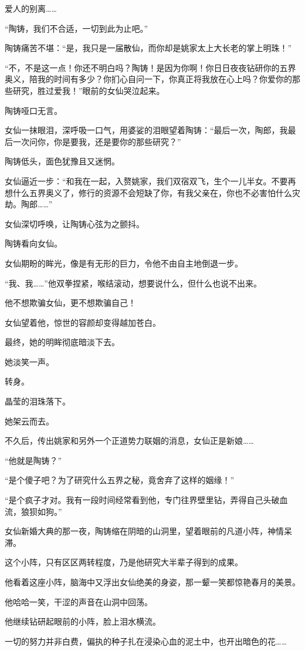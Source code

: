 \begin{this_body}
爱人的别离……

“陶铸，我们不合适，一切到此为止吧。”

陶铸痛苦不堪：“是，我只是一届散仙，而你却是姚家太上大长老的掌上明珠！”

“不，不是这一点！你还不明白吗？陶铸！是因为你啊！你日日夜夜钻研你的五界奥义，陪我的时间有多少？你扪心自问一下，你真正将我放在心上吗？你爱你的那些研究，胜过爱我！”眼前的女仙哭泣起来。

陶铸哑口无言。

女仙一抹眼泪，深呼吸一口气，用婆娑的泪眼望着陶铸：“最后一次，陶郎，我最后一次问你，你是要我，还是要你的那些研究？”

陶铸低头，面色犹豫且又迷惘。

女仙逼近一步：“和我在一起，入赘姚家，我们双宿双飞，生个一儿半女。不要再想什么五界奥义了，修行的资源不会短缺了你，有我父亲在，你也不必害怕什么灾劫。陶郎……”

女仙深切呼唤，让陶铸心弦为之颤抖。

陶铸看向女仙。

女仙期盼的眸光，像是有无形的巨力，令他不由自主地倒退一步。

“我、我……”他双拳捏紧，喉结滚动，想要说什么，但什么也说不出来。

他不想欺骗女仙，更不想欺骗自己！

女仙望着他，惊世的容颜却变得越加苍白。

最终，她的明眸彻底暗淡下去。

她淡笑一声。

转身。

晶莹的泪珠落下。

她架云而去。

不久后，传出姚家和另外一个正道势力联姻的消息，女仙正是新娘……

“他就是陶铸？”

“是个傻子吧？为了研究什么五界之秘，竟舍弃了这样的姻缘！”

“是个疯子才对。我有一段时间经常看到他，专门往界壁里钻，弄得自己头破血流，狼狈如狗。”

女仙新婚大典的那一夜，陶铸缩在阴暗的山洞里，望着眼前的凡道小阵，神情呆滞。

这个小阵，只有区区两转程度，乃是他研究大半辈子得到的成果。

他看着这座小阵，脑海中又浮出女仙绝美的身姿，那一颦一笑都惊艳春月的美景。

他哈哈一笑，干涩的声音在山洞中回荡。

他继续钻研起眼前的小阵，脸上泪水横流。

一切的努力并非白费，偏执的种子扎在浸染心血的泥土中，也开出暗色的花……


\end{this_body}
